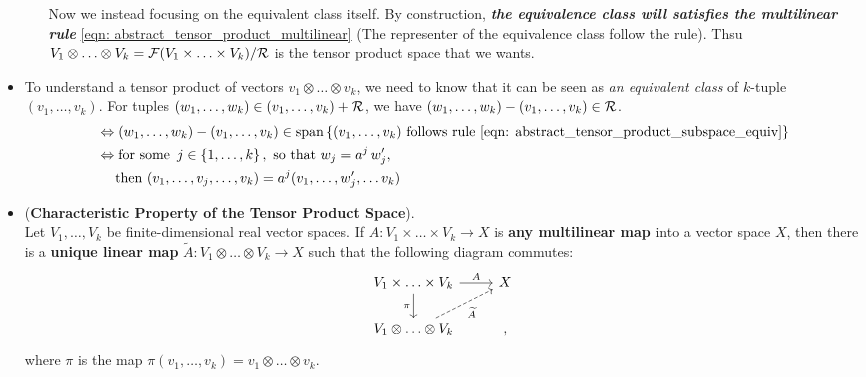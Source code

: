 \documentclass[11pt]{article}
\begin{document}
\begin{itemize}
\begin{remark}
\begin{enumerate}
Now we instead focusing on the equivalent class itself. By construction, \emph{\textbf{the equivalence class will satisfies the multilinear rule}} \eqref{eqn: abstract_tensor_product_multilinear} (The representer of the equivalence class follow the rule). Thsu $V_1 \otimes \ldots \otimes V_k = {\mathcal F}(V_1\times \ldots \times V_k) / {\mathcal R}$ is the tensor product space that we wants. 
\end{enumerate}
\end{remark}

\item \begin{remark}
To understand a tensor product of vectors $v_{1} \otimes \ldots \otimes v_{k}$, we need to know that it can be seen as \emph{an equivalent class} of $k$-tuple $(v_{1}, \ldots, v_{k}) $. For  tuples $(w_{1}, \ldots, w_{k}) \in (v_{1}, \ldots, v_{k}) + {\mathcal R}$, we have $ (w_{1}, \ldots, w_{k}) - (v_{1}, \ldots, v_{k}) \in {\mathcal R}$.
\begin{align*}
 &\Leftrightarrow (w_{1}, \ldots, w_{k}) - (v_{1}, \ldots, v_{k}) \in  \text{span}\left\{(v_{1}, \ldots, v_{k}) \text{ follows rule }\eqref{eqn: abstract_tensor_product_subspace_equiv}\right\} \\
&\Leftrightarrow \text{for some }\,j \in \left\{1,\ldots, k\right\}, \text{ so that }w_{j} = a^{j}\,w_{j}', \\
&\quad \text{ then } (v_{1}, \ldots, v_j, \ldots, v_{k}) = a^{j}(v_{1}, \ldots, w_{j}', \ldots v_{k})
\end{align*}
\end{remark}

\item \begin{proposition} (\textbf{Characteristic Property of the Tensor Product Space}).\\
Let  $V_1,\ldots,V_k$ be finite-dimensional real vector spaces. If $A: V_1\times \ldots \times V_k \rightarrow X$ is \textbf{any multilinear map} into a vector space $X$, then there is a \textbf{unique linear map} $\widetilde{A}: V_1\otimes \ldots \otimes V_k \rightarrow X$ such that the following diagram commutes:
\begin{equation}
  \begin{tikzcd}
    V_1\times \ldots \times V_k  \arrow{r}{A}  \arrow[swap]{d}{\pi}  & X  \\
    V_1\otimes \ldots \otimes V_k \arrow[ur,  dashrightarrow, swap, "\widetilde{A}"] &,  
  \end{tikzcd} \label{eqn: diagram_tensor_product}
\end{equation} where $\pi$ is the map $\pi(v_1, \ldots, v_k) = v_1 \otimes \ldots \otimes v_k$.
\end{proposition}


\end{itemize}
\end{document}
